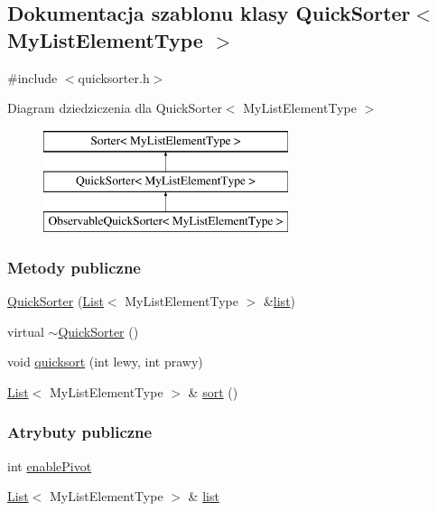 \hypertarget{class_quick_sorter}{\subsection{Dokumentacja szablonu klasy Quick\-Sorter$<$ My\-List\-Element\-Type $>$}
\label{class_quick_sorter}
}


{\ttfamily \#include $<$quicksorter.\-h$>$}

Diagram dziedziczenia dla Quick\-Sorter$<$ My\-List\-Element\-Type $>$\begin{figure}[H]
\begin{center}
\leavevmode
\includegraphics[height=3.000000cm]{class_quick_sorter}
\end{center}
\end{figure}
\subsubsection*{Metody publiczne}
\begin{DoxyCompactItemize}
\item 
\hyperlink{class_quick_sorter_a48497adf59b538717b4820721fd5d195}{Quick\-Sorter} (\hyperlink{class_list}{List}$<$ My\-List\-Element\-Type $>$ \&\hyperlink{class_quick_sorter_a60a7a4772c958f256962294418e83fe4}{list})
\item 
virtual \hyperlink{class_quick_sorter_a43fa61b5b452ba73a7a2da7690e478ab}{$\sim$\-Quick\-Sorter} ()
\item 
void \hyperlink{class_quick_sorter_aefa16c2996c131443c10183219797632}{quicksort} (int lewy, int prawy)
\item 
\hyperlink{class_list}{List}$<$ My\-List\-Element\-Type $>$ \& \hyperlink{class_quick_sorter_ae2b74900a972d05c06df3c9a06123c00}{sort} ()
\end{DoxyCompactItemize}
\subsubsection*{Atrybuty publiczne}
\begin{DoxyCompactItemize}
\item 
int \hyperlink{class_quick_sorter_aba28a6d8a0209191c937fc2bf8c83861}{enable\-Pivot}
\item 
\hyperlink{class_list}{List}$<$ My\-List\-Element\-Type $>$ \& \hyperlink{class_quick_sorter_a60a7a4772c958f256962294418e83fe4}{list}
\end{DoxyCompactItemize}


